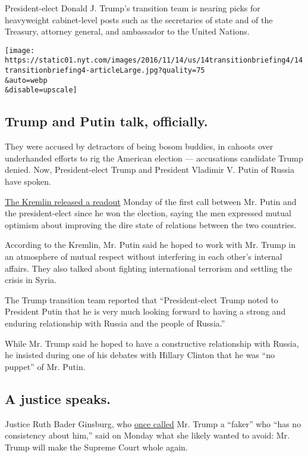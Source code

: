 President-elect Donald J. Trump's transition team is nearing picks for
heavyweight cabinet-level posts such as the secretaries of state and of
the Treasury, attorney general, and ambassador to the United Nations.

\texttt{[image: https://static01.nyt.com/images/2016/11/14/us/14transitionbriefing4/14transitionbriefing4-articleLarge.jpg?quality=75\\\&auto=webp\\\&disable=upscale]}

\hypertarget{trump-and-putin-talk-officially}{%
\subsection{Trump and Putin talk,
officially.}\label{trump-and-putin-talk-officially}}

They were accused by detractors of being bosom buddies, in cahoots over
underhanded efforts to rig the American election --- accusations
candidate Trump denied. Now, President-elect Trump and President
Vladimir V. Putin of Russia have spoken.

\href{http://kremlin.ru/events/president/news/53255}{The Kremlin
released a readout} Monday of the first call between Mr. Putin and the
president-elect since he won the election, saying the men expressed
mutual optimism about improving the dire state of relations between the
two countries.

According to the Kremlin, Mr. Putin said he hoped to work with Mr. Trump
in an atmosphere of mutual respect without interfering in each other's
internal affairs. They also talked about fighting international
terrorism and settling the crisis in Syria.

The Trump transition team reported that ``President-elect Trump noted to
President Putin that he is very much looking forward to having a strong
and enduring relationship with Russia and the people of Russia.''

While Mr. Trump said he hoped to have a constructive relationship with
Russia, he insisted during one of his debates with Hillary Clinton that
he was ``no puppet'' of Mr. Putin.

\hypertarget{a-justice-speaks}{%
\subsection{A justice speaks.}\label{a-justice-speaks}}

Justice Ruth Bader Ginsburg, who
\href{http://www.cnn.com/2016/07/12/politics/justice-ruth-bader-ginsburg-donald-trump-faker/}{once
called} Mr. Trump a ``faker'' who ``has no consistency about him,'' said
on Monday what she likely wanted to avoid: Mr. Trump will make the
Supreme Court whole again.

